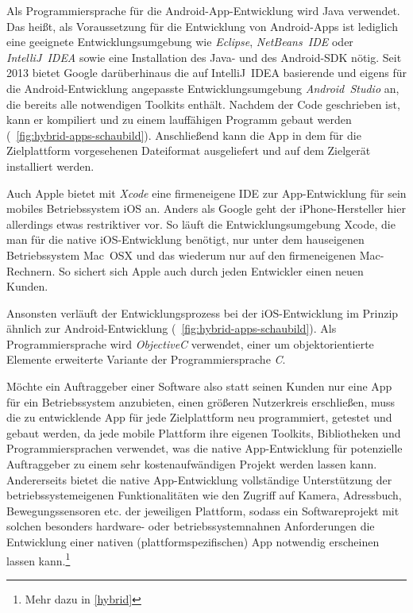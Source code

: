 Als Programmiersprache für die Android-App-Entwicklung wird Java verwendet. Das heißt, als Voraussetzung für die Entwicklung von Android-Apps ist lediglich eine geeignete Entwicklungsumgebung wie \textsl{Eclipse}, \textsl{NetBeans\ IDE} oder \textsl{IntelliJ\ IDEA} sowie eine Installation des Java- und des Android-SDK nötig. 
Seit 2013 bietet Google darüberhinaus die auf IntelliJ~IDEA basierende und eigens für die Android-Entwicklung angepasste Entwicklungsumgebung \emph{Android~Studio} an,\cite{android-studio} die bereits alle notwendigen Toolkits enthält. 
Nachdem der Code geschrieben ist, kann er kompiliert und zu einem lauffähigen Programm gebaut werden (\seename\ \autoref{fig:hybrid-apps-schaubild}). Anschließend kann die App in dem für die Zielplattform vorgesehenen Dateiformat ausgeliefert und auf dem Zielgerät installiert werden.

Auch Apple bietet mit \textsl{Xcode} eine firmeneigene IDE zur App-Entwicklung für sein mobiles Betriebssystem iOS an. Anders als Google geht der iPhone-Hersteller hier allerdings etwas restriktiver vor. So läuft die Entwicklungsumgebung Xcode, die man für die native iOS-Entwicklung benötigt, nur unter dem hauseigenen Betriebssystem Mac~OSX und das wiederum nur auf den firmeneigenen Mac-Rechnern. So sichert sich Apple auch durch jeden Entwickler einen neuen Kunden.

Ansonsten verläuft der Entwicklungsprozess bei der iOS-Entwicklung im Prinzip ähnlich zur Android-Entwicklung (\seename\ \autoref{fig:hybrid-apps-schaubild}).
Als Programmiersprache wird \emph{ObjectiveC} verwendet, einer um objektorientierte Elemente erweiterte Variante der Programmiersprache \emph{C}.

Möchte ein Auftraggeber einer Software also statt seinen Kunden nur eine App für ein Betriebssystem anzubieten, einen größeren Nutzerkreis erschließen, muss die zu entwicklende App für jede Zielplattform neu programmiert, getestet und gebaut werden, da jede mobile Plattform ihre eigenen Toolkits, Bibliotheken und Programmiersprachen verwendet, was die native App-Entwicklung für potenzielle Auftraggeber zu einem sehr kostenaufwändigen Projekt werden lassen kann.
Andererseits bietet die native App-Entwicklung vollständige Unterstützung der betriebssystemeigenen Funktionalitäten wie den Zugriff auf Kamera, Adressbuch, Bewegungssensoren etc. der jeweiligen Plattform, sodass ein Softwareprojekt mit solchen besonders hardware- oder betriebssystemnahnen Anforderungen die Entwicklung einer nativen (plattformspezifischen) App notwendig erscheinen lassen kann.\footnote{Mehr dazu in \autoref{hybrid}}

